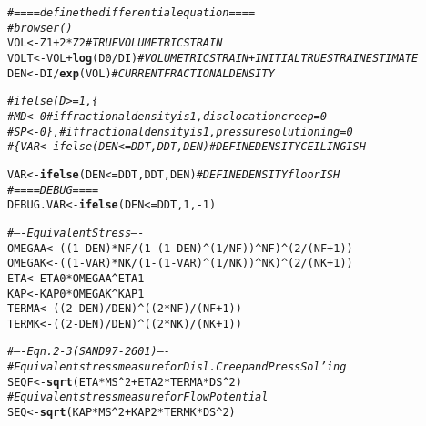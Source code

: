 \documentclass{article}\usepackage[]{graphicx}\usepackage[]{color}
\makeatletter
\newcommand{\hlnum}[1]{\textcolor[rgb]{0.686,0.059,0.569}{#1}}%
\newcommand{\hlcom}[1]{\textcolor[rgb]{0.678,0.584,0.686}{\textit{#1}}}%
\newcommand{\hlopt}[1]{\textcolor[rgb]{0,0,0}{#1}}%
\newcommand{\hlstd}[1]{\textcolor[rgb]{0.345,0.345,0.345}{#1}}%
\newcommand{\hlkwb}[1]{\textcolor[rgb]{0.69,0.353,0.396}{#1}}%
\newcommand{\hlkwd}[1]{\textcolor[rgb]{0.737,0.353,0.396}{\textbf{#1}}}%
\newenvironment{kframe}{%
 \def\at@end@of@kframe{}%
 \ifinner\ifhmode%
  \def\at@end@of@kframe{\end{minipage}}%
  \begin{minipage}{\columnwidth}%
 \fi\fi%
 \def\FrameCommand##1{\hskip\@totalleftmargin \hskip-\fboxsep
 \colorbox{shadecolor}{##1}\hskip-\fboxsep
     \hskip-\linewidth \hskip-\@totalleftmargin \hskip\columnwidth}%
 \MakeFramed {\advance\hsize-\width
   \@totalleftmargin\z@ \linewidth\hsize
   \@setminipage}}%
 {\par\unskip\endMakeFramed%
 \at@end@of@kframe}
\newenvironment{knitrout}{}{} %
\makeatother
\begin{document}
\begin{knitrout}
\begin{kframe}
\begin{alltt}
    \hlcom{# ==== define the differential equation ====}
    \hlcom{# browser()}
    \hlstd{VOL}         \hlkwb{<-} \hlstd{Z1} \hlopt{+} \hlnum{2}\hlopt{*}\hlstd{Z2}                        \hlcom{# TRUE VOLUMETRIC STRAIN}
    \hlstd{VOLT}        \hlkwb{<-} \hlstd{VOL} \hlopt{+} \hlkwd{log}\hlstd{(D0}\hlopt{/}\hlstd{DI)}     \hlcom{# VOLUMETRIC STRAIN + INITIAL TRUE STRAIN ESTIMATE}
    \hlstd{DEN}         \hlkwb{<-} \hlstd{DI}\hlopt{/}\hlkwd{exp}\hlstd{(VOL)}                  \hlcom{# CURRENT FRACTIONAL DENSITY}

    \hlcom{#     ifelse(D >= 1,\{}
    \hlcom{#       MD <- 0  # if fractional density is 1, disclocation creep = 0}
    \hlcom{#       SP <- 0\},# if fractional density is 1, pressure solutioning = 0}
    \hlcom{#     \{VAR <- ifelse(DEN <= DDT, DDT, DEN) # DEFINE DENSITY CEILING ISH}

    \hlstd{VAR} \hlkwb{<-} \hlkwd{ifelse}\hlstd{(DEN} \hlopt{<=} \hlstd{DDT, DDT, DEN)} \hlcom{# DEFINE DENSITY floor ISH}
    \hlcom{# ==== DEBUG ====}
    \hlstd{DEBUG.VAR} \hlkwb{<-} \hlkwd{ifelse}\hlstd{(DEN} \hlopt{<=} \hlstd{DDT,} \hlnum{1}\hlstd{,} \hlopt{-}\hlnum{1}\hlstd{)}

    \hlcom{# ---- Equivalent Stress ----}
    \hlstd{OMEGAA}      \hlkwb{<-} \hlstd{((}\hlnum{1} \hlopt{-} \hlstd{DEN)} \hlopt{*} \hlstd{NF} \hlopt{/} \hlstd{(}\hlnum{1} \hlopt{-} \hlstd{(}\hlnum{1} \hlopt{-} \hlstd{DEN)}\hlopt{^}\hlstd{(}\hlnum{1}\hlopt{/}\hlstd{NF))}\hlopt{^}\hlstd{NF)}\hlopt{^}\hlstd{(}\hlnum{2}\hlopt{/}\hlstd{(NF} \hlopt{+} \hlnum{1}\hlstd{))}
    \hlstd{OMEGAK}      \hlkwb{<-} \hlstd{((}\hlnum{1} \hlopt{-} \hlstd{VAR)} \hlopt{*} \hlstd{NK} \hlopt{/} \hlstd{(}\hlnum{1} \hlopt{-} \hlstd{(}\hlnum{1} \hlopt{-} \hlstd{VAR)}\hlopt{^}\hlstd{(}\hlnum{1}\hlopt{/}\hlstd{NK))}\hlopt{^}\hlstd{NK)}\hlopt{^}\hlstd{(}\hlnum{2}\hlopt{/}\hlstd{(NK} \hlopt{+} \hlnum{1}\hlstd{))}
    \hlstd{ETA}         \hlkwb{<-} \hlstd{ETA0} \hlopt{*} \hlstd{OMEGAA}\hlopt{^}\hlstd{ETA1}
    \hlstd{KAP}         \hlkwb{<-} \hlstd{KAP0} \hlopt{*} \hlstd{OMEGAK}\hlopt{^}\hlstd{KAP1}
    \hlstd{TERMA}       \hlkwb{<-} \hlstd{((}\hlnum{2} \hlopt{-} \hlstd{DEN)}\hlopt{/}\hlstd{DEN)}\hlopt{^}\hlstd{((}\hlnum{2} \hlopt{*} \hlstd{NF)}\hlopt{/}\hlstd{(NF} \hlopt{+} \hlnum{1}\hlstd{))}
    \hlstd{TERMK}       \hlkwb{<-} \hlstd{((}\hlnum{2} \hlopt{-} \hlstd{DEN)}\hlopt{/}\hlstd{DEN)}\hlopt{^}\hlstd{((}\hlnum{2} \hlopt{*} \hlstd{NK)}\hlopt{/}\hlstd{(NK} \hlopt{+} \hlnum{1}\hlstd{))}

    \hlcom{# ---- Eqn. 2-3 (SAND97-2601) ----}
    \hlcom{# Equivalent stress measure for Disl. Creep and Press Sol'ing}
    \hlstd{SEQF}        \hlkwb{<-} \hlkwd{sqrt}\hlstd{(ETA} \hlopt{*} \hlstd{MS}\hlopt{^}\hlnum{2} \hlopt{+} \hlstd{ETA2} \hlopt{*} \hlstd{TERMA} \hlopt{*} \hlstd{DS}\hlopt{^}\hlnum{2}\hlstd{)}
    \hlcom{# Equivalent stress measure for Flow Potential}
    \hlstd{SEQ}         \hlkwb{<-} \hlkwd{sqrt}\hlstd{(KAP} \hlopt{*} \hlstd{MS}\hlopt{^}\hlnum{2} \hlopt{+} \hlstd{KAP2} \hlopt{*} \hlstd{TERMK} \hlopt{*} \hlstd{DS}\hlopt{^}\hlnum{2}\hlstd{)}


\end{alltt}
\end{kframe}
\end{knitrout}
\end{document}
